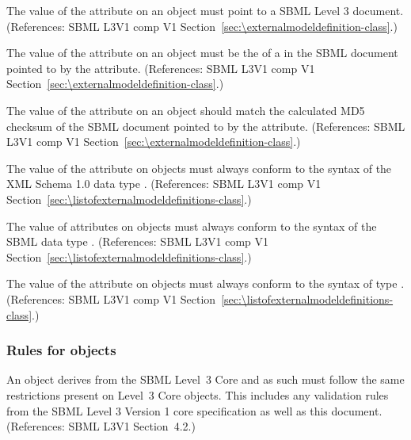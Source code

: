 \begin{sbmlenum}
 { The value of the  attribute on an
  \ExternalModelDefinition object must point to a SBML Level 3 document.
  (References: SBML L3V1 comp V1 Section~\ref{sec:\externalmodeldefinition-class}.) }


 { The value of the  attribute on an
  \ExternalModelDefinition object must be the  of a \Model
  in the SBML document pointed to by the  attribute.
  (References: SBML L3V1 comp V1 Section~\ref{sec:\externalmodeldefinition-class}.) }


 { The value of the  attribute on an
  \ExternalModelDefinition object should match the
  calculated MD5 checksum of the SBML document pointed to by the 
   attribute.
  (References: SBML L3V1 comp V1 Section~\ref{sec:\externalmodeldefinition-class}.) }


 { The value of the  attribute on
  \ExternalModelDefinition objects must always conform to the syntax of
  the XML Schema 1.0 data type .
  (References: SBML L3V1 comp V1 
  Section~\ref{sec:\listofexternalmodeldefinitions-class}.) }


 { The value of  attributes on
  \ExternalModelDefinition objects must always conform to the syntax of
  the SBML data type .
  (References: SBML L3V1 comp V1 
  Section~\ref{sec:\listofexternalmodeldefinitions-class}.) }


 { The value of the  attribute on
  \ExternalModelDefinition objects must always conform to the syntax of
  type .
  (References: SBML L3V1 comp V1 
  Section~\ref{sec:\listofexternalmodeldefinitions-class}.) }


\end{sbmlenum} \subsubsection*{Rules for  objects} \begin{sbmlenum}

 { An \ModelDefinition object derives from the SBML
  Level~3 Core  and as such must follow the same restrictions 
  present on Level~3 Core \Model objects.
  This includes any validation rules from the SBML Level 3 Version 1
  core specification as well as this document.
   (References: SBML L3V1 Section~4.2.) }


\end{sbmlenum}
